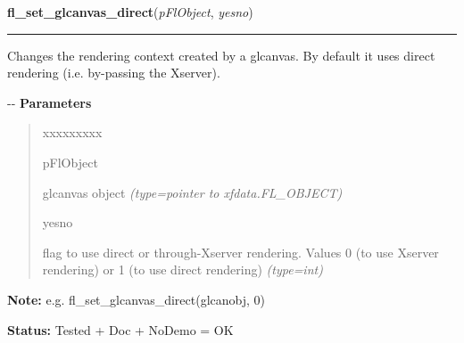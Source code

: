 \hspace{.8\funcindent}\begin{boxedminipage}{\funcwidth}

    \raggedright \textbf{fl\_set\_glcanvas\_direct}(\textit{pFlObject}, \textit{yesno})

    \vspace{-1.5ex}

    \rule{\textwidth}{0.5\fboxrule}
\setlength{\parskip}{2ex}

Changes the rendering context created by a glcanvas. By default it
uses direct rendering (i.e. by-passing the Xserver).

-{}-
\setlength{\parskip}{1ex}
      \textbf{Parameters}
      \vspace{-1ex}

      \begin{quote}
        \begin{Ventry}{xxxxxxxxx}

          \item[pFlObject]


glcanvas object
            {\it (type=pointer to xfdata.FL\_OBJECT)}

          \item[yesno]


flag to use direct or through-Xserver rendering. Values 0 (to use
Xserver rendering) or 1 (to use direct rendering)
            {\it (type=int)}

        \end{Ventry}

      \end{quote}

\textbf{Note:} 
e.g. fl\_set\_glcanvas\_direct(glcanobj, 0)


\textbf{Status:} 
Tested + Doc + NoDemo = OK


    \end{boxedminipage}

    \label{xformslib:flglcanvas:fl_activate_glcanvas}

    \vspace{0.5ex}

